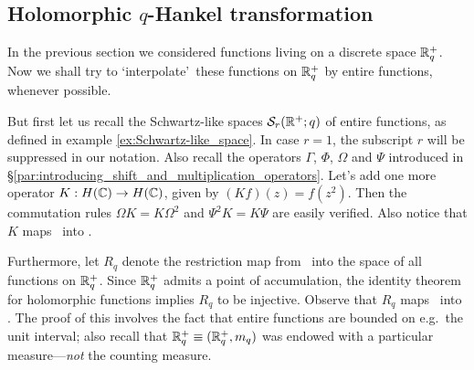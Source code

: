 


\subsection{Holomorphic $q$-Hankel transformation}

In the previous section we considered functions living on a discrete space $\mathbb{R}_q^+$.
Now we shall try to \lq interpolate\rq\ these functions on $\mathbb{R}_q^+$ by entire functions,
whenever possible.

But first let us recall the  Schwartz-like spaces ${\mathcal S}_r(\mathbb{R}^+;q)$
of entire functions, as defined in example \ref{ex:Schwartz-like_space}\@.
In case $r=1$, the subscript $r$ will be suppressed in our notation.
Also recall the operators $\Gamma$, $\Phi$, $\Omega$ and $\Psi$ introduced in
\S \ref{par:introducing_shift_and_multiplication_operators}\@.
Let's add one more operator $K: H(\mathbb{C}) \rightarrow H(\mathbb{C})$, given by $(Kf)(z)=f(z^2)$.
Then the commutation rules $\Omega K = K\Omega^2$ and $\Psi^2 K = K \Psi$ are easily verified.
Also notice that $K$ maps \Swqbis\ into \Swq\@.

Furthermore, let $R_q$ denote the restriction map from \HC\ into
the space of all functions on $\mathbb{R}_q^+$. Since $\mathbb{R}_q^+$ admits a
point of accumulation, the identity theorem for holomorphic functions
implies $R_q$ to be injective.
Observe that $R_q$ maps \Swq\ into \Ltwoq\@. The proof of this involves
the fact that entire functions are bounded on e.g.\ the unit interval;
also recall that $\mathbb{R}_q^+ \equiv (\mathbb{R}_q^+,m_q)$ was endowed with a particular
measure---{\em not\/} the counting measure.



